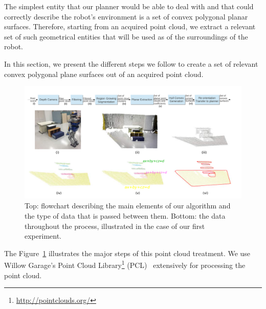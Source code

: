 The simplest entity that our planner would be able to deal with and that could correctly describe the robot's environment is a set of convex polygonal planar surfaces.
Therefore, starting from an acquired point cloud, we extract a relevant set of such geometrical entities that will be used as of the surroundings of the robot.

In this section, we present the different steps we follow to create a set of relevant convex polygonal plane surfaces out of an acquired point cloud.

\begin{figure}
\centering
  \includegraphics[width=\linewidth]{complete_pipeline.pdf}
  \caption{Top: flowchart describing the main elements of our algorithm and the type of data that is passed between them. Bottom: the data throughout the process, illustrated in the case of our first experiment.}
\label{fig:full_pipeline}
\end{figure}

The Figure~\ref{fig:full_pipeline} illustrates the major steps of this point cloud treatment.
We use Willow Garage's Point Cloud Library\footnote{\url{http://pointclouds.org/}} (PCL)~\cite{rusu:icra:2011} extensively for processing the point cloud.

